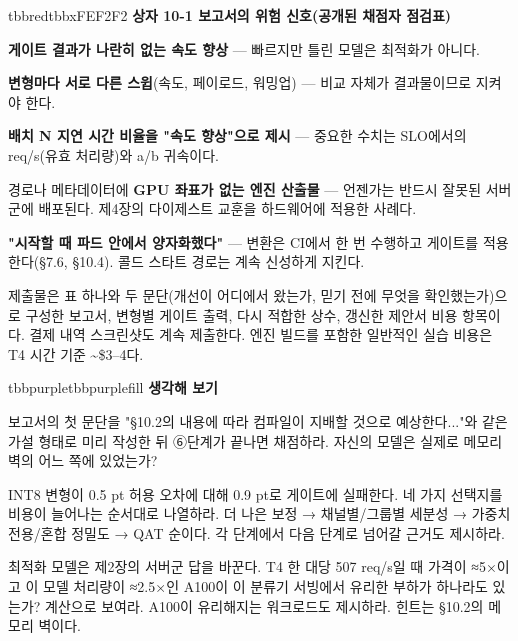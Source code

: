 \begin{calloutbox}{tbbred}{tbbxFEF2F2}
{\normalsize\bfseries\color{tbbx991B1B}상자 10-1  보고서의 위험 신호(공개된 채점자 점검표)}\par\vspace{3pt}
\begin{tbbitemize}
  \item \textbf{게이트 결과가 나란히 없는 속도 향상} — 빠르지만 틀린 모델은 최적화가 아니다.
  \item \textbf{변형마다 서로 다른 스윕}(속도, 페이로드, 워밍업) — 비교 자체가 결과물이므로 지켜야 한다.
  \item \textbf{배치 N 지연 시간 비율을 "속도 향상"으로 제시} — 중요한 수치는 SLO에서의 req/s(유효 처리량)와 a/b 귀속이다.
  \item 경로나 메타데이터에 \textbf{GPU 좌표가 없는 엔진 산출물} — 언젠가는 반드시 잘못된 서버군에 배포된다. 제4장의 다이제스트 교훈을 하드웨어에 적용한 사례다.
  \item \textbf{"시작할 때 파드 안에서 양자화했다"} — 변환은 CI에서 한 번 수행하고 게이트를 적용한다(§7.6, §10.4). 콜드 스타트 경로는 계속 신성하게 지킨다.
\end{tbbitemize}
\end{calloutbox}

\vspace{3.0pt}

제출물은 표 하나와 두 문단(개선이 어디에서 왔는가, 믿기 전에 무엇을 확인했는가)으로 구성한 보고서, 변형별 게이트 출력, 다시 적합한 상수, 갱신한 제안서 비용 항목이다. 결제 내역 스크린샷도 계속 제출한다. 엔진 빌드를 포함한 일반적인 실습 비용은 T4 시간 기준 \textasciitilde{}\$3–4다.

\begin{calloutbox}{tbbpurple}{tbbpurplefill}
{\normalsize\bfseries\color{tbbpurple}생각해 보기}\par\vspace{3pt}
\begin{tbbitemize}
  \item 보고서의 첫 문단을 "§10.2의 내용에 따라 컴파일이 지배할 것으로 예상한다..."와 같은 가설 형태로 미리 작성한 뒤 ⑥단계가 끝나면 채점하라. 자신의 모델은 실제로 메모리 벽의 어느 쪽에 있었는가?
  \item INT8 변형이 0.5 pt 허용 오차에 대해 0.9 pt로 게이트에 실패한다. 네 가지 선택지를 비용이 늘어나는 순서대로 나열하라. 더 나은 보정 → 채널별/그룹별 세분성 → 가중치 전용/혼합 정밀도 → QAT 순이다. 각 단계에서 다음 단계로 넘어갈 근거도 제시하라.
  \item 최적화 모델은 제2장의 서버군 답을 바꾼다. T4 한 대당 507 req/s일 때 가격이 ≈5×이고 이 모델 처리량이 ≈2.5×인 A100이 이 분류기 서빙에서 유리한 부하가 하나라도 있는가? 계산으로 보여라. A100이 유리해지는 워크로드도 제시하라. 힌트는 §10.2의 메모리 벽이다.
\end{tbbitemize}
\end{calloutbox}

